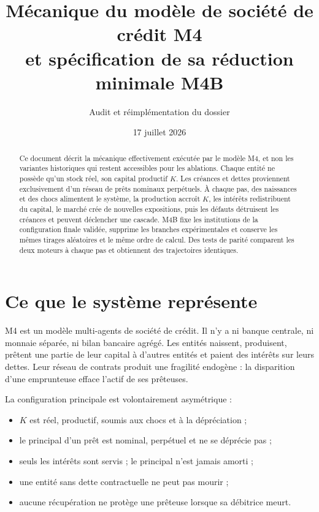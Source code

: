 \documentclass[11pt,a4paper]{article}
\title{Mécanique du modèle de société de crédit M4\\
\large et spécification de sa réduction minimale M4B}
\author{Audit et réimplémentation du dossier \code{m4\_credit\_soc\_fable}}
\date{17 juillet 2026}
\begin{document}
\maketitle

\begin{abstract}
Ce document décrit la mécanique effectivement exécutée par le modèle M4,
et non les variantes historiques qui restent accessibles pour les ablations.
Chaque entité ne possède qu'un stock réel, son capital productif $K$. Les
créances et dettes proviennent exclusivement d'un réseau de prêts nominaux
perpétuels. À chaque pas, des naissances et des chocs alimentent le système,
la production accroît $K$, les intérêts redistribuent du capital, le marché
crée de nouvelles expositions, puis les défauts détruisent les créances et
peuvent déclencher une cascade. M4B fixe les institutions de la configuration
finale validée, supprime les branches expérimentales et conserve les mêmes
tirages aléatoires et le même ordre de calcul. Des tests de parité comparent
les deux moteurs à chaque pas et obtiennent des trajectoires identiques.
\end{abstract}

\tableofcontents

\section{Ce que le système représente}

M4 est un modèle multi-agents de société de crédit. Il n'y a ni banque
centrale, ni monnaie séparée, ni bilan bancaire agrégé. Les entités naissent,
produisent, prêtent une partie de leur capital à d'autres entités et paient
des intérêts sur leurs dettes. Leur réseau de contrats produit une fragilité
endogène : la disparition d'une emprunteuse efface l'actif de ses prêteuses.

La configuration principale est volontairement asymétrique :

\begin{itemize}
\item $K$ est réel, productif, soumis aux chocs et à la dépréciation ;
\item le principal d'un prêt est nominal, perpétuel et ne se déprécie pas ;
\item seuls les intérêts sont servis ; le principal n'est jamais amorti ;
\item une entité sans dette contractuelle ne peut pas mourir ;
\item aucune récupération ne protège une prêteuse lorsque sa débitrice meurt.
\end{itemize}
\end{document}
